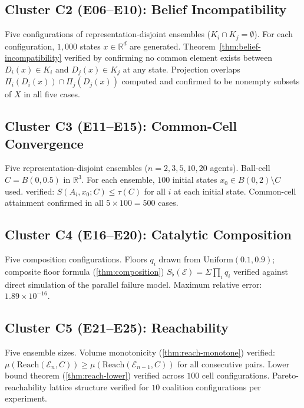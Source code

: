 \documentclass[twocolumn,11pt,a4paper]{article}
\theoremstyle{remark}
\newcommand{\R}{\mathbb{R}}
\newcommand{\Sflat}{S_{\flat}}
\newcommand{\Reach}{\mathrm{Reach}}
\newcommand{\tol}{\tau}
\newcommand{\Ens}{\mathcal{E}}            %
\begin{document}
\subsection*{Cluster C2 (E06--E10): Belief Incompatibility}

Five configurations of representation-disjoint ensembles ($K_i \cap K_j =
\emptyset$).  For each configuration, $1{,}000$ states $x \in \R^d$ are
generated.  Theorem~\ref{thm:belief-incompatibility} verified by confirming
no common element exists between $D_i(x) \in K_i$ and $D_j(x) \in K_j$
at any state.  Projection overlaps $\Pi_i(D_i(x)) \cap \Pi_j(D_j(x))$
computed and confirmed to be nonempty subsets of $X$ in all five cases.

\subsection*{Cluster C3 (E11--E15): Common-Cell Convergence}

Five representation-disjoint ensembles ($n = 2, 3, 5, 10, 20$ agents).
Ball-cell $C = B(0, 0.5)$ in $\R^3$.  For each ensemble, $100$ initial
states $x_0 \in B(0, 2) \setminus C$ used.   verified:
$S(A_i, x_0; C) \le \tol(C)$ for all $i$ at each initial state.
Common-cell attainment confirmed in all $5 \times 100 = 500$ cases.

\subsection*{Cluster C4 (E16--E20): Catalytic Composition}

Five composition configurations.  Floors $q_i$ drawn from
$\mathrm{Uniform}(0.1, 0.9)$; composite floor formula (\cref{thm:composition})
$\Sflat(\Ens) = \Sigma \prod_i q_i$ verified against direct simulation of
the parallel failure model.  Maximum relative error: $1.89 \times 10^{-16}$.

\subsection*{Cluster C5 (E21--E25): Reachability}

Five ensemble sizes.  Volume monotonicity (\cref{thm:reach-monotone})
verified: $\mu(\Reach(\Ens_n, C)) \ge \mu(\Reach(\Ens_{n-1}, C))$ for all
consecutive pairs.  Lower bound theorem (\cref{thm:reach-lower}) verified
across $100$ cell configurations.  Pareto-reachability lattice structure
verified for $10$ coalition configurations per experiment.
\end{document}
